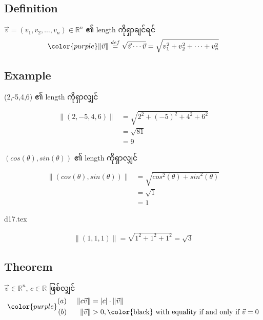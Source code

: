 \subsection{Definition}
$\vec{v}=(v_1,v_2,\dots,v_n)\in\mathbb{R}^n$ ၏ length ကိုရှာချင်ရင်
\begin{equation}
    {\color{purple} \|\vec{v}\|\stackrel{def}{=}\sqrt{\vec{v}\cdots\vec{v}}=\sqrt{v_1^2+v_2^2+\dots+v_n^2}}
\end{equation}

\subsection{Example}
(2,-5,4,6) ၏ length ကိုရှာလျှင်

\[
    \begin{split}
        \|(2,-5,4,6)\| & = \sqrt{2^2+(-5)^2+4^2+6^2} \\
                       & = \sqrt{81}                 \\
                       & = 9
    \end{split}
\]

$(cos(\theta),sin(\theta))$ ၏ length ကိုရှာလျှင်

\[
    \begin{split}
        \|(cos(\theta),sin(\theta))\| & =\sqrt{{cos}^2(\theta)+{sin}^2(\theta)} \\
                                      & =\sqrt{1}                               \\
                                      & =1
    \end{split}
\]
\begin{center}
    {d17.tex}
\end{center}
\[
    \begin{split}
        \|(1,1,1)\|=\sqrt{1^2+1^2+1^2}=\sqrt{3}
    \end{split}
\]

\subsection{Theorem}

$\vec{v}\in\mathbb{R}^n$, $c\in\mathbb{R}$ ဖြစ်လျှင်
\begin{equation}
    {\color{purple} \begin{split}
            (a)\hspace{5mm}\|c\vec{v}\|  & =|c|\cdot\|\vec{v}\|                                            \\
            (b)\hspace{6.5mm}\|\vec{v}\| & > 0,\text{\color{black} with equality if and only if }\vec{v}=0
        \end{split}}
\end{equation}

